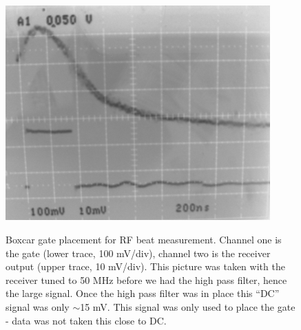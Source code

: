 \begin{figure}
\begin{center}
\leavevmode
\includegraphics[width=4in]
{gate/gate.png}\\
\end{center}
\caption[Boxcar gate placement for RF beat measurement]{Boxcar gate placement for RF beat measurement. Channel one is the gate (lower trace, 100 mV/div), channel two is the receiver output (upper trace, 10 mV/div). This picture was taken with the receiver tuned to 50 MHz before we had the high pass filter, hence the large signal. Once the high pass filter was in place this ``DC'' signal was only $\sim$15 mV. This signal was only used to place the gate - data was not taken this close to DC.}
\label{gate}
\end{figure} 
